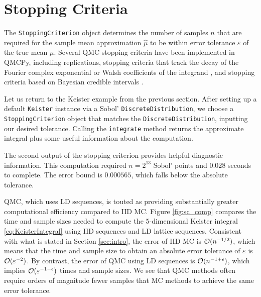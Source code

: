 \documentclass[graybox,footinfo]{svmult}
\newcommand{\hmu}{\widehat{\mu}}
\begin{document}
\section{Stopping Criteria} \label{sec:stopping_crit}

The \texttt{StoppingCriterion} object determines the number of samples $n$ that are required for the sample mean approximation $\hmu$ to be within error tolerance $\varepsilon$ of the true mean $\mu$.  Several QMC stopping criteria have been implemented in QMCPy, including replications, stopping criteria that track the decay of the Fourier complex exponential or Walsh coefficients of the integrand \cite{HicJim16a,HicEtal17a,JimHic16a}, and stopping criteria based on Bayesian credible intervals \cite{RatHic19a,JagHic22a}.

Let us return to the Keister example from the previous section.  After setting up  a default \texttt{Keister} instance via a Sobol' \texttt{DiscreteDistribution}, we choose a \texttt{StoppingCriterion} object that matches the \texttt{DiscreteDistribution}, inputting our desired tolerance.  Calling the  \texttt{integrate} method returns the approximate integral plus some useful information about the computation.

The second output of the stopping criterion provides helpful diagnostic information.  This computation required $n=2^{13}$ Sobol' points and $0.028$ seconds to complete.  The error bound is $0.000565$, which falls below the absolute tolerance.

QMC, which uses LD sequences, is touted as providing substantially greater computational efficiency compared to IID MC.
Figure \ref{fig:sc_comp} compares the time and sample sizes needed to compute the $5$-dimensional Keister integral \eqref{eq:KeisterIntegral} using IID sequences and LD lattice sequences. Consistent with what is stated in Section \ref{sec:intro}, the error of IID MC is ${\mathcal{O}}(n^{-1/2})$, which means that the time and sample size to obtain an absolute error tolerance of $\varepsilon$ is ${\mathcal{O}}(\varepsilon^{-2})$.  By contrast, the  error of QMC using LD sequences is ${\mathcal{O}}(n^{-1+\epsilon})$, which implies ${\mathcal{O}}(\varepsilon^{-1-\epsilon})$ times and sample sizes.  We see that QMC methods often require orders of magnitude fewer samples that MC methods to achieve the same error tolerance.
\end{document}
